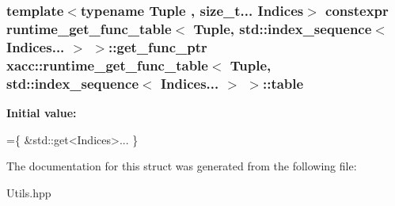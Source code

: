 \subsubsection[{\texorpdfstring{table}{table}}]{\setlength{\rightskip}{0pt plus 5cm}template$<$typename Tuple , size\+\_\+t... Indices$>$ constexpr {\bf runtime\+\_\+get\+\_\+func\+\_\+table}$<$ Tuple, std\+::index\+\_\+sequence$<$ Indices... $>$ $>$\+::get\+\_\+func\+\_\+ptr {\bf xacc\+::runtime\+\_\+get\+\_\+func\+\_\+table}$<$ Tuple, std\+::index\+\_\+sequence$<$ Indices... $>$ $>$\+::table\hspace{0.3cm}{\ttfamily [static]}}\hypertarget{a00254_a80921470cc04db92bab9127ae768d759}{}\label{a00254_a80921470cc04db92bab9127ae768d759}
{\bfseries Initial value\+:}
\begin{DoxyCode}
=\{
        &std::get<Indices>...
    \}
\end{DoxyCode}


The documentation for this struct was generated from the following file\+:\begin{DoxyCompactItemize}
\item 
Utils.\+hpp\end{DoxyCompactItemize}
